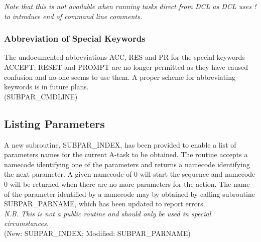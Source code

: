{\em Note that this is not available when running tasks direct from DCL as DCL
uses ! to introduce end of command line comments.}

\subsubsection{Abbreviation of Special Keywords}
The undocumented abbreviations ACC, RES and PR for the special keywords
ACCEPT, RESET and PROMPT are no longer permitted as they have caused
confusion and no-one seems to use them. A proper scheme for abbreviating
keywords is in future plans.\\
(SUBPAR\_CMDLINE)
\subsection{Listing Parameters}
A new subroutine, SUBPAR\_INDEX, has been provided to enable a list of
parameters names for the current A-task to be obtained.
The routine accepts a namecode identifying one of the parameters and returns
a namecode identifying the next parameter. A given namecode of 0 will start
the sequence and namecode 0 will be returned when there are no more
parameters for the action.
The name of the parameter identified by a namecode may by obtained by calling
subroutine SUBPAR\_PARNAME, which has been updated to report errors.\\
{\em N.B. This is not a public routine and should only be used in special
circumstances.}\\
(New: SUBPAR\_INDEX; Modified: SUBPAR\_PARNAME)

